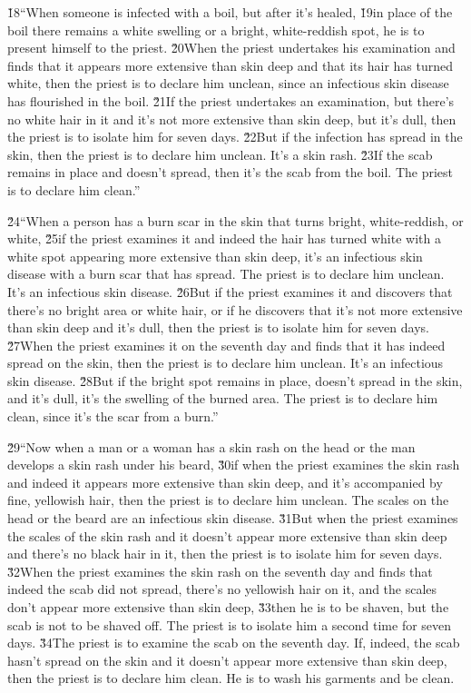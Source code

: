 \v{18}``When someone is infected with a boil, but after it's healed, \v{19}in place of the boil there remains a white swelling or a bright, white-reddish spot, he is to present himself to the priest. \v{20}When the priest undertakes his examination and finds that it appears more extensive than skin deep and that its hair has turned white, then the priest is to declare him unclean, since an infectious skin disease has flourished in the boil. \v{21}If the priest undertakes an examination, but there's no white hair in it and it's not more extensive than skin deep, but it's dull, then the priest is to isolate him for seven days. \v{22}But if the infection has spread in the skin, then the priest is to declare him unclean. It's a skin rash. \v{23}If the scab remains in place and doesn't spread, then it's the scab from the boil. The priest is to declare him clean.''

\v{24}``When a person has a burn scar in the skin that turns bright, white-reddish, or white, \v{25}if the priest examines it and indeed the hair has turned white with a white spot appearing more extensive than skin deep, it's an infectious skin disease with a burn scar that has spread. The priest is to declare him unclean. It's an infectious skin disease. \v{26}But if the priest examines it and discovers that there's no bright area or white hair, or if he discovers that it's not more extensive than skin deep and it's dull, then the priest is to isolate him for seven days. \v{27}When the priest examines it on the seventh day and finds that it has indeed spread on the skin, then the priest is to declare him unclean. It's an infectious skin disease. \v{28}But if the bright spot remains in place, doesn't spread in the skin, and it's dull, it's the swelling of the burned area. The priest is to declare him clean, since it's the scar from a burn.''

\v{29}``Now when a man or a woman has a skin rash on the head or the man develops a skin rash under his beard, \v{30}if when the priest examines the skin rash and indeed it appears more extensive than skin deep, and it's accompanied by fine, yellowish hair, then the priest is to declare him unclean. The scales on the head or the beard are an infectious skin disease. \v{31}But when the priest examines the scales of the skin rash and it doesn't appear more extensive than skin deep and there's no black hair in it, then the priest is to isolate him for seven days. \v{32}When the priest examines the skin rash on the seventh day and finds that indeed the scab did not spread, there's no yellowish hair on it, and the scales don't appear more extensive than skin deep, \v{33}then he is to be shaven, but the scab is not to be shaved off. The priest is to isolate him a second time for seven days. \v{34}The priest is to examine the scab on the seventh day. If, indeed, the scab hasn't spread on the skin and it doesn't appear more extensive than skin deep, then the priest is to declare him clean. He is to wash his garments and be clean.

